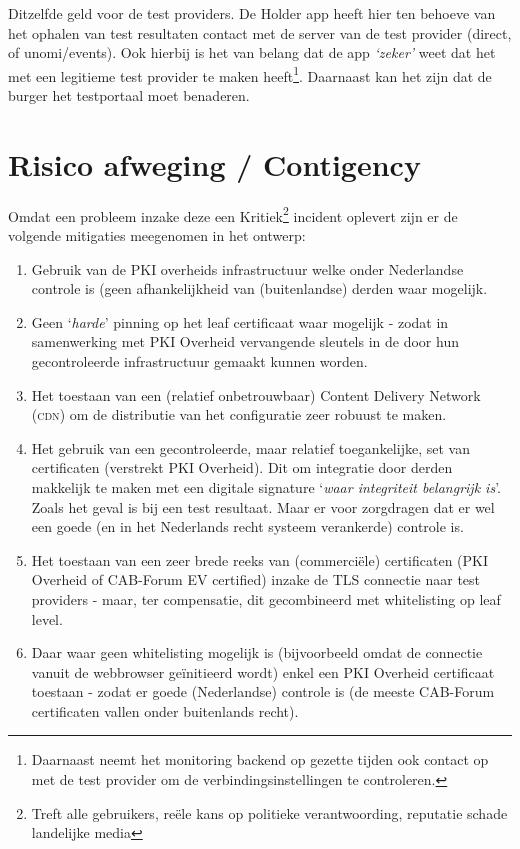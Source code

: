 \documentclass[11.0pt,twoside,openright]{report}
\begin{document}
Ditzelfde geld voor de test providers.
\fi
De Holder app heeft hier ten behoeve van het ophalen van test resultaten contact met de server van de test provider (direct, of unomi/events). Ook hierbij is het van belang dat de app \emph{`zeker'} weet dat het met een legitieme test provider te maken heeft\footnote{Daarnaast neemt het monitoring backend op gezette tijden ook contact op met de test provider om de verbindingsinstellingen te controleren.}. Daarnaast kan het zijn dat de burger het testportaal moet benaderen.

\section{Risico afweging / Contigency}

Omdat een probleem inzake deze een  Kritiek\footnote{Treft alle gebruikers, reële kans op politieke verantwoording, reputatie schade landelijke media} incident oplevert zijn er de volgende mitigaties meegenomen in het ontwerp:

\begin{enumerate}
\item Gebruik van de PKI overheids infrastructuur welke onder Nederlandse controle is (geen afhankelijkheid van (buitenlandse) derden waar mogelijk.
\ifdefined\testsonly
\else\item Geen `\emph{harde}' pinning op het leaf certificaat waar mogelijk - zodat in samenwerking met PKI Overheid vervangende sleutels in de door hun gecontroleerde infrastructuur gemaakt kunnen worden.
\item Het toestaan van een (relatief onbetrouwbaar) Content Delivery Network (\textsc{cdn}) om de distributie van het configuratie zeer robuust te maken.
\fi
\item Het gebruik van een gecontroleerde, maar relatief toegankelijke, set van certificaten (verstrekt PKI Overheid). Dit om integratie door derden makkelijk te maken met een digitale signature `\emph{waar integriteit belangrijk is}'. Zoals het geval is bij een test resultaat. Maar er voor zorgdragen dat er wel een goede (en in het Nederlands recht systeem verankerde) controle is.
\item Het toestaan van een zeer brede reeks van (commerciële) certificaten (PKI Overheid of CAB-Forum EV certified) inzake de TLS connectie naar test providers - maar, ter compensatie, dit gecombineerd met whitelisting op leaf level.
\item Daar waar geen whitelisting mogelijk is (bijvoorbeeld omdat de connectie vanuit de webbrowser geïnitieerd wordt) enkel een PKI Overheid certificaat toestaan - zodat er goede (Nederlandse) controle is (de meeste CAB-Forum certificaten vallen onder buitenlands recht).
\end{enumerate}
\end{document}
